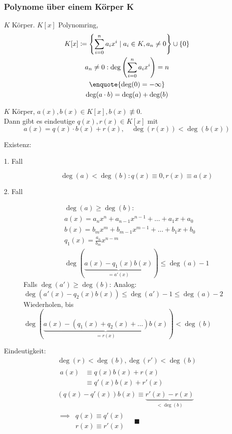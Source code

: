 \subsubsection{Polynome über einem Körper K}
\begin{def*}[note = Polynomring , index = Polynomring]
	$K$ Körper. $K[x]$ Polynomring,
	\begin{gather*}
		K[x] \coloneqq \left\{ \sum_{i=0}^n a_i x^i \mid a_i \in K , a_n \neq 0 \right\} \cup \{ 0 \} \\
		a_n \neq 0 : \deg\left( \sum_{i=0}^n a_i x^i \right) = n \\
		\enquote{\deg(0) = -\infty} \\
		\deg(a \cdot b) = \deg(a) + \deg(b)
	\end{gather*}
\end{def*}
\begin{satz*}[note = (Euklid)]
	$K$ Körper, $a(x) , b(x) \in K[x] , b(x) \not\equiv 0$.\\
	Dann gibt es eindeutige $q(x) , r(x) \in K[x]$ mit
	\[ a(x) = q(x) \cdot b(x) + r(x) , \quad \deg(r(x)) < \deg(b(x)) \]
	\begin{bew}
		Existenz:
		\begin{description}
			\item[1. Fall] \[ \deg(a) < \deg(b) : q(x) \equiv 0 , r(x) \equiv a(x) \]
			\item[2. Fall]
				\begin{gather*}
					\deg(a) \geq \deg(b) :	\\
					a(x) = a_n x^n + a_{n-1} x^{n-1} + \dots + a_1 x + a_0 \\
					b(x) = b_m x^m + b_{m-1} x^{m-1} + \dots + b_1 x + b_0 \\
					q_1(x) = \frac{a_n}{b_m} x^{n-m} \\
					\deg(\underbrace{a(x) - q_1(x) b(x)}_{=a'(x)}) \leq \deg(a) - 1
				\end{gather*}
				Falls $\deg(a') \geq \deg(b)$: Analog: $\deg(a'(x) - q_2(x) b(x)) \leq \deg(a') - 1 \leq \deg(a) - 2$ \\
				Wiederholen, bis $\deg(\underbrace{a(x) - ( q_1(x) + q_2(x) + \dots ) b(x)}_{=r(x)}) < \deg(b)$
		\end{description}
		Eindeutigkeit:
		\begin{gather*}
			\deg(r) < \deg(b) , \deg(r') < \deg(b) \\
			\begin{split}
				a(x)	&\equiv q(x) b(x) + r(x) \\
					&\equiv q'(x) b(x) + r'(x)
			\end{split} \\
			(q(x) - q'(x)) b(x) \equiv \underbrace{r'(x) - r(x)}_{<\deg(b)} \\
			\begin{split}
				\implies	&q(x) \equiv q'(x) \\
						&r(x) \equiv r'(x)
			\end{split} \quad \blacksquare
		\end{gather*}
	\end{bew}
\end{satz*}

